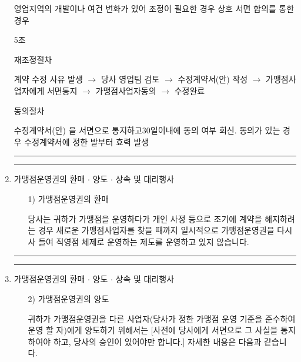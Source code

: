 \documentclass[a5paper,10pt]{oblivoir}
\newcommand\crule[3][black]{\textcolor{#1}{\rule{#2}{#3}}}
\begin{document}
\begin{enumerate}
\begin{tiny}
\begin{Form}
 영업지역의 개발이나 여건 변화가 있어 조정이 필요한 경우 상호 서면 합의를 통한 경우

\noindent\dotfill 
5조


  재조정절차

\noindent\dotfill 

 계약 수정 사유 발생 $\to$  당사 영업팀 검토 $\to$  수정계약서(안) 작성  $\to$   가맹점사업자에게 서면통지  $\to$   가맹점사업자동의  $\to$   수정완료

 동의절차

\noindent\dotfill 

수정계약서(안) 을 서면으로 통지하고30일이내에 동의 여부 회신. 동의가 있는 경우 수정계약서에 정한 발부터 효력 발생

\end{Form}
\end{tiny}
\newpage
\begin{center}
\crule[red]{4cm}{0.1cm} \crule[blue]{4cm}{0.1cm}
\end{center}
\item 가맹점운영권의 환매 $\cdot$ 양도 $\cdot$ 상속 및 대리행사
\begin{enumerate}
\item[1)] 가맹점운영권의 환매

당사는 귀하가 가맹점을 운영하다가 개인 사정 등으로 조기에 계약을 해지하려는 경우 새로운 가맹점사업자를 찾을 때까지 일시적으로 가맹점운영권을 다시 사 들여 직영점 체제로 운영하는 제도를 운영하고 있지 않습니다.
\end{enumerate}

\newpage
\begin{center}
\crule[red]{4cm}{0.1cm} \crule[blue]{4cm}{0.1cm}
\end{center}
\item 가맹점운영권의 환매 $\cdot$ 양도 $\cdot$ 상속 및 대리행사
\begin{enumerate}
\item[2)] 가맹점운영권의 양도

귀하가 가맹점운영권을 다른 사업자(당사가 정한 가맹점 운영 기준을 준수하여 운영 할 자)에게 양도하기 위해서는 [사전에 당사에게 서면으로 그 사실을 통지하여야 하고, 당사의 승인이 있어야만 합니다.] 자세한 내용은 다음과 같습니다.

\begin{tiny}
\begin{Form}
\def\LayoutCheckField#1#2{%
  \parbox[c][5mm]{5mm}{\centering\footnotesize\strut #1\\#2}%
}
\def\LayoutCheckField#1#2{%
  \makebox[0pt][l]{%
    \makebox[5mm][c]{\footnotesize\strut #1}%
  }%
  #2%
}
\def\DefaultHeightofCheckBox{5mm}
\def\DefaultWidthofCheckBox{5mm}



\end{Form}
\end{tiny}
\end{enumerate}
\end{enumerate}
\end{document}
